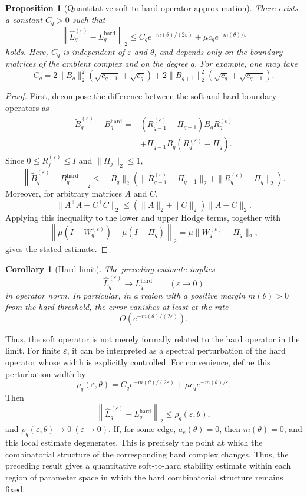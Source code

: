 \documentclass[pdflatex,sn-mathphys-num]{sn-jnl}%
\theoremstyle{thmstyleone}%
\newtheorem{proposition}[theorem]{Proposition}%
\theoremstyle{thmstyletwo}%
\newtheorem{corollary}[theorem]{Corollary}
\theoremstyle{thmstylethree}%
\begin{document}
\begin{proposition}[Quantitative soft-to-hard operator approximation]
There exists a constant \(C_q>0\) such that
\[
\left\|
\widehat L_q^{(\varepsilon)}
-
L_q^{\mathrm{hard}}
\right\|_2
\le
C_q
e^{-m(\theta)/(2\varepsilon)}
+
\mu c_q
e^{-m(\theta)/\varepsilon}
\]
holds.
Here, \(C_q\) is independent of \(\varepsilon\) and \(\theta\), and depends only on the boundary matrices of the ambient complex and on the degree \(q\).
For example, one may take
\[
C_q
=
2\|B_q\|_2^2
\left(
\sqrt{c_{q-1}}+\sqrt{c_q}
\right)
+
2\|B_{q+1}\|_2^2
\left(
\sqrt{c_q}+\sqrt{c_{q+1}}
\right).
\]
\end{proposition}

\begin{proof}
First, decompose the difference between the soft and hard boundary operators as
\[
\begin{aligned}
\widetilde B_q^{(\varepsilon)}
-
B_q^{\mathrm{hard}}
={}&
\left(
R_{q-1}^{(\varepsilon)}-\Pi_{q-1}
\right)
B_qR_q^{(\varepsilon)}
\\
&+
\Pi_{q-1}B_q
\left(
R_q^{(\varepsilon)}-\Pi_q
\right).
\end{aligned}
\]
Since \(0\le R_j^{(\varepsilon)}\le I\) and \(\|\Pi_j\|_2\le1\),
\[
\left\|
\widetilde B_q^{(\varepsilon)}
-
B_q^{\mathrm{hard}}
\right\|_2
\le
\|B_q\|_2
\left(
\|R_{q-1}^{(\varepsilon)}-\Pi_{q-1}\|_2
+
\|R_q^{(\varepsilon)}-\Pi_q\|_2
\right).
\]
Moreover, for arbitrary matrices \(A\) and \(C\),
\[
\|A^\top A-C^\top C\|_2
\le
(\|A\|_2+\|C\|_2)\|A-C\|_2.
\]
Applying this inequality to the lower and upper Hodge terms, together with
\[
\left\|
\mu(I-W_q^{(\varepsilon)})
-
\mu(I-\Pi_q)
\right\|_2
=
\mu
\|W_q^{(\varepsilon)}-\Pi_q\|_2,
\]
gives the stated estimate.
\end{proof}

\begin{corollary}[Hard limit]
The preceding estimate implies
\[
\widehat L_q^{(\varepsilon)}
\longrightarrow
L_q^{\mathrm{hard}}
\qquad
(\varepsilon\to0)
\]
in operator norm.
In particular, in a region with a positive margin \(m(\theta)>0\) from the hard threshold, the error vanishes at least at the rate
\[
O\left(
e^{-m(\theta)/(2\varepsilon)}
\right).
\]
\end{corollary}

Thus, the soft operator is not merely formally related to the hard operator in the limit. For finite \(\varepsilon\), it can be interpreted as a spectral perturbation of the hard operator whose width is explicitly controlled.
For convenience, define this perturbation width by
\[
\rho_q(\varepsilon,\theta)
=
C_q
e^{-m(\theta)/(2\varepsilon)}
+
\mu c_q
e^{-m(\theta)/\varepsilon}.
\]
Then
\[
\left\|
\widehat L_q^{(\varepsilon)}
-
L_q^{\mathrm{hard}}
\right\|_2
\le
\rho_q(\varepsilon,\theta),
\]
and
$\rho_q(\varepsilon,\theta)
\longrightarrow0
~
(\varepsilon\to0)$.
If, for some edge,
$a_e(\theta)=0$,
then \(m(\theta)=0\), and this local estimate degenerates. This is precisely the point at which the combinatorial structure of the corresponding hard complex changes.
Thus, the preceding result gives a quantitative soft-to-hard stability estimate within each region of parameter space in which the hard combinatorial structure remains fixed.
\end{document}
